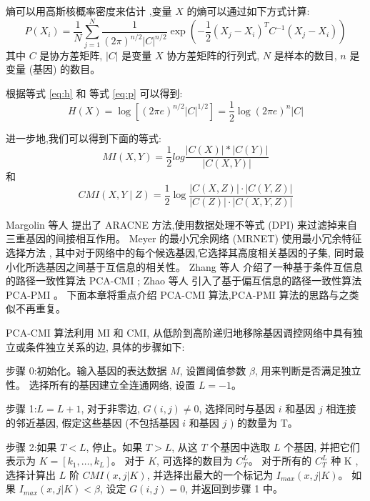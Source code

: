 熵可以用高斯核概率密度来估计 ,变量 $X$ 的熵可以通过如下方式计算:
\begin{equation}
  \label{eq:p}
P\left(X_{i}\right)=\frac{1}{N} \sum_{j=1}^{N} \frac{1}{(2 \pi)^{n / 2}|C|^{n / 2}} \exp \left(-\frac{1}{2}\left(X_{j}-X_{i}\right)^{T} C^{-1}\left(X_{j}-X_{i}\right)\right)
\end{equation}
其中 $C$ 是协方差矩阵, $|C|$ 是变量 $X$ 协方差矩阵的行列式, $N$ 是样本的数目, $n$ 是变量 (基因) 的数目。

根据等式 \ref{eq:h} 和 等式 \ref{eq:p} 可以得到:
\begin{equation}
  H(X)=\log \left[(2 \pi e)^{n / 2}|C|^{1 / 2}\right]=\frac{1}{2} \log (2 \pi e)^{n}|C| 
\end{equation}

进一步地,我们可以得到下面的等式:
\begin{equation}
    MI(X,Y)=\frac{1}{2}log\frac{|C(X)|*|C(Y)|}{|C(X,Y)|}
\end{equation}
和
\begin{equation}
  CMI(X, Y \mid Z)=\frac{1}{2} \log \frac{|C(X, Z)| \cdot|C(Y, Z)|}{|C(Z)| \cdot|C(X, Y, Z)|}
\end{equation}

Margolin 等人 提出了 ARACNE 方法,使用数据处理不等式 (DPI) 来过滤掉来自三重基因的间接相互作用。
Meyer  的最小冗余网络 (MRNET) 使用最小冗余特征选择方法 ,
其中对于网络中的每个候选基因,它选择其高度相关基因的子集, 同时最小化所选基因之间基于互信息的相关性。
Zhang 等人  介绍了一种基于条件互信息的路径一致性算法 PCA-CMI ; 
Zhao 等人  引入了基于偏互信息的路径一致性算法 PCA-PMI 。
下面本章将重点介绍 PCA-CMI 算法,PCA-PMI 算法的思路与之类似不再重复。

PCA-CMI 算法利用 MI 和 CMI, 从低阶到高阶递归地移除基因调控网络中具有独立或条件独立关系的边, 具体的步骤如下:

步骤 0:初始化。输入基因的表达数据 $M$, 设置阈值参数 $\beta$, 用来判断是否满足独立性。
选择所有的基因建立全连通网络, 设置 $L=-1$。

步骤 1:$L=L+1$, 对于非零边, $G(i,j) \neq 0$, 选择同时与基因 $i$ 和基因 $j$ 相连接的邻近基因, 
假定这些基因 (不包括基因 $i$ 和基因 $j$ ) 的数量为 T。

步骤 2:如果 $T<L$, 停止。如果 $T>L$, 从这 $T$ 个基因中选取 $L$ 个基因, 
并把它们表示为 $K=[k_1,\ldots,k_L]$。
对于 $K$, 可选择的数目为 $C_T^L$。
对于所有的 $C_T^L$ 种 K ,选择计算出 $L$ 阶 $CMI(x,j|K)$,
并选择出最大的一个标记为 $I_{max}(x,j|K)$。
如果 $I_{max}(x,j|K) < \beta$, 设定 $G(i,j)=0$, 并返回到步骤 1 中。

